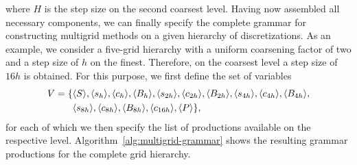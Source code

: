 where $H$ is the step size on the second coarsest level.
Having now assembled all necessary components, we can finally specify the complete grammar for constructing multigrid methods on a given hierarchy of discretizations.
As an example, we consider a five-grid hierarchy with a uniform coarsening factor of two and a step size of $h$ on the finest.
Therefore, on the coarsest level a step size of $16h$ is obtained.
For this purpose, we first define the set of variables 
\begin{align}
	V = \{ & \langle S \rangle, \langle s_h \rangle, \langle c_h \rangle, \langle B_h \rangle, \langle s_{2h} \rangle, \langle c_{2h} \rangle, \langle B_{2h} \rangle, \langle s_{4h} \rangle, \langle c_{4h} \rangle, \langle B_{4h} \rangle, \\
	& \langle s_{8h} \rangle, \langle c_{8h} \rangle, \langle B_{8h} \rangle, \langle c_{16h} \rangle, \langle P \rangle \},
	\label{eq:multigrid-grammar-variables}
\end{align}
for each of which we then specify the list of productions available on the respective level. 
Algorithm~\ref{alg:multigrid-grammar} shows the resulting grammar productions for the complete grid hierarchy.
